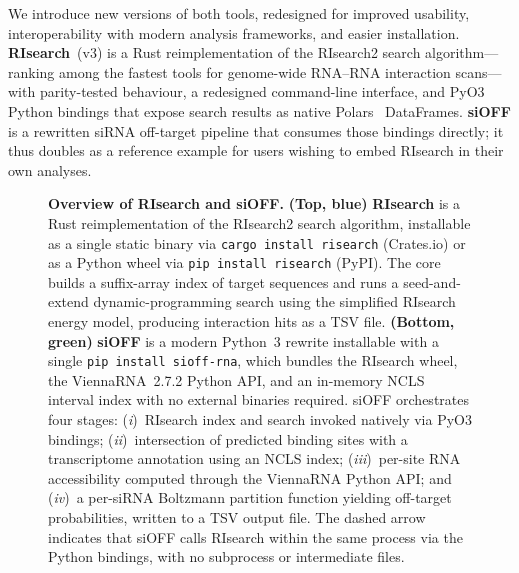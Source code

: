 We introduce new versions of both tools, redesigned for improved usability, interoperability with modern analysis frameworks, and easier installation.
\textbf{RIsearch}~(v3) is a Rust reimplementation of the RIsearch2 search algorithm---ranking among the fastest tools for genome-wide RNA--RNA interaction scans---with parity-tested behaviour, a redesigned command-line interface, and PyO3 Python bindings that expose search results as native Polars~\citep{polars} DataFrames.
\textbf{siOFF} is a rewritten siRNA off-target pipeline that consumes those bindings directly; it thus doubles as a reference example for users wishing to embed RIsearch in their own analyses.

\begin{figure}[t]
\centering
\resizebox{\linewidth}{!}{}
\caption{
  \textbf{Overview of RIsearch and siOFF.}
  \textbf{(Top, blue)} \textbf{RIsearch} is a Rust reimplementation of the RIsearch2 search algorithm, installable as a single static binary via \texttt{cargo install risearch} (Crates.io) or as a Python wheel via \texttt{pip install risearch} (PyPI).
  The core builds a suffix-array index of target sequences and runs a seed-and-extend dynamic-programming search using the simplified RIsearch energy model, producing interaction hits as a TSV file.
  \textbf{(Bottom, green)} \textbf{siOFF} is a modern Python~3 rewrite installable with a single \texttt{pip install sioff-rna}, which bundles the RIsearch wheel, the ViennaRNA~2.7.2 Python API, and an in-memory NCLS interval index with no external binaries required.
  siOFF orchestrates four stages: (\textit{i})~RIsearch index and search invoked natively via PyO3 bindings; (\textit{ii})~intersection of predicted binding sites with a transcriptome annotation using an NCLS index; (\textit{iii})~per-site RNA accessibility computed through the ViennaRNA Python API; and (\textit{iv})~a per-siRNA Boltzmann partition function yielding off-target probabilities, written to a TSV output file.
  The dashed arrow indicates that siOFF calls RIsearch within the same process via the Python bindings, with no subprocess or intermediate files.
}
\label{fig:summary}
\end{figure}

